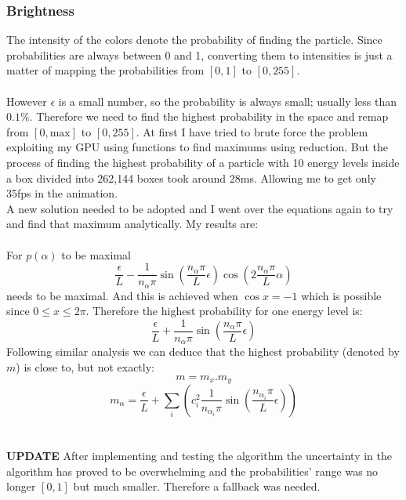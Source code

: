 \documentclass[a4paper, 10pt]{article}
\begin{document}
        \subsubsection{Brightness}
        The intensity of the colors denote the probability of finding the particle. Since
        probabilities are always between 0 and 1, converting them to intensities is just
        a matter of mapping the probabilities from $[0, 1]$ to $[0, 255]$.\\\\
        However $\epsilon$ is a small number, so the probability is always small; usually
        less than $0.1\%$. Therefore we need to find the highest probability in the space
        and remap from $[0, \text{max}]$ to $[0, 255]$. At first I have tried to brute force
        the problem exploiting my GPU using functions to find maximums using reduction. But
        the process of finding the highest probability of a particle with 10 energy levels
        inside a box divided into 262,144 boxes took around 28ms. Allowing me to get only
        35fps in the animation.\\
        A new solution needed to be adopted and I went over the equations again to try and
        find that maximum analytically. My results are:\\\\
        For $p(\alpha)$ to be maximal
        $$\frac{\epsilon}{L} - \frac{1}{n_{\alpha}\pi} \sin\left(\frac{n_{\alpha}\pi}{L}\epsilon\right)
        \cos\left(2\frac{n_{\alpha}\pi}{L}\alpha\right)$$
        needs to be maximal.  And this is achieved when $\cos{x} = -1$ which is possible
        since $0 \leq x \leq 2\pi$. Therefore the highest probability for one energy
        level is: 
        $$\frac{\epsilon}{L} + \frac{1}{n_{\alpha}\pi} \sin(\frac{n_{\alpha}\pi}{L}\epsilon)$$
        Following similar analysis we can deduce that the highest probability (denoted by
        $m$) is close to,
        but not exactly:
        $$m = m_x . m_y$$
        $$m_{\alpha} = \frac{\epsilon}{L} + \sum_i \left ( c^2_i \frac{1}{n_{\alpha_i}\pi}
        \sin\left(\frac{n_{\alpha_i}\pi}{L}\epsilon\right) \right )$$\\\\
        \textbf{UPDATE} After implementing and testing the algorithm the uncertainty in the algorithm
        has proved to be overwhelming and the probabilities' range was no longer $[0, 1]$ but much smaller.
        Therefore a fallback was needed.\\\\
\end{document}
